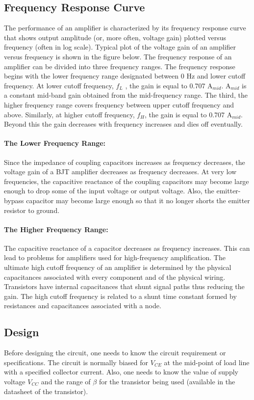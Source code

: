 \subsection*{Frequency Response Curve}
The performance of an amplifier is characterized by its frequency response curve that
shows output amplitude (or, more often, voltage gain) plotted versus frequency (often in
log scale). Typical plot of the voltage gain of an amplifier versus frequency is shown in
the figure below. The frequency response of an amplifier can be divided into three
frequency ranges.
The frequency response begins with the lower frequency range designated between 0 Hz
and lower cutoff frequency. At lower cutoff frequency, $f_L$ , the gain is equal to 0.707 A$_{mid}$.
A$_{mid}$ is a constant mid-band gain obtained from the mid-frequency range. The third, the
higher frequency range covers frequency between upper cutoff frequency and above.
Similarly, at higher cutoff frequency, $f_H$, the gain is equal to 0.707 A$_{mid}$. Beyond this the
gain decreases with frequency increases and dies off eventually.\\

\paragraph{\textbf{The Lower Frequency Range: }}
Since the impedance of coupling capacitors increases as frequency decreases, the voltage
gain of a BJT amplifier decreases as frequency decreases. At very low frequencies, the
capacitive reactance of the coupling capacitors may become large enough to drop some
of the input voltage or output voltage. Also, the emitter-bypass capacitor may become
large enough so that it no longer shorts the emitter resistor to ground.
\paragraph{\textbf{The Higher Frequency Range: }}
The capacitive reactance of a capacitor decreases as frequency increases. This can lead to
problems for amplifiers used for high-frequency amplification. The ultimate high cutoff
frequency of an amplifier is determined by the physical capacitances associated with
every component and of the physical wiring. Transistors have internal capacitances that
shunt signal paths thus reducing the gain. The high cutoff frequency is related to a shunt
time constant formed by resistances and capacitances associated with a node.

\subsection*{Design}
Before designing the circuit, one needs to know the circuit requirement or specifications.
The circuit is normally biased for $V_{CE}$ at the mid-point of load line with a specified
collector current. Also, one needs to know the value of supply voltage $V_{CC}$ and the range
of $\beta$ for the transistor being used (available in the datasheet of the transistor).

